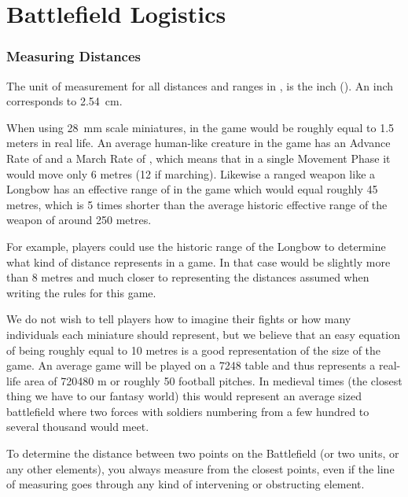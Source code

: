 
\part{Battlefield Logistics}

\section{Measuring Distances}
\label{measuring_distances}

The unit of measurement for all distances and ranges in \nameofthegame{}, is the inch (\si{\inch}). An inch corresponds to \SI{2.54}{\centi\meter}.

When using \SI{28}{mm} scale miniatures,  in the game would be roughly equal to \num{1.5} meters in real life. An average human-like creature in the game has an Advance Rate of  and a March Rate of , which means that in a single Movement Phase it would move only \num{6} metres (\num{12} if marching). Likewise a ranged weapon like a Longbow has an effective range of  in the game which would equal roughly \num{45} metres, which is 5 times shorter than the average historic effective range of the weapon of around \num{250} metres.

For example, players could use the historic range of the Longbow to determine what kind of distance  represents in a game. In that case  would be slightly more than 8 metres and much closer to representing the distances assumed when writing the rules for this game.

We do not wish to tell players how to imagine their fights or how many individuals each miniature should represent, but we believe that an easy equation of  being roughly equal to \num{10} metres is a good representation of the size of the game. An average game will be played on a \num{72}\timess{}\num{48}\si{\inch} table and thus represents a real-life area of \num{720}\timess{}\num{480} \si{\meter} or roughly 50 football pitches. In medieval times (the closest thing we have to our fantasy world) this would represent an average sized battlefield where two forces with soldiers numbering from a few hundred to several thousand would meet.

To determine the distance between two points on the Battlefield (or two units, or any other elements), you always measure from the closest points, even if the line of measuring goes through any kind of intervening or obstructing element.


